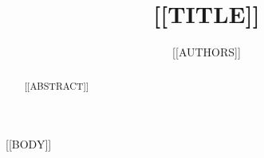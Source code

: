 \documentclass[conference]{IEEEtran}
\begin{document}
\title{[[TITLE]]}
\author{[[AUTHORS]]}
\maketitle

\begin{abstract}
[[ABSTRACT]]
\end{abstract}

[[BODY]]
\end{document}
